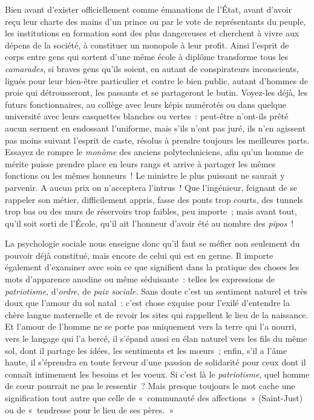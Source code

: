 \documentclass[french,twoside]{book} %
\begin{document}
Bien avant d’exister officiellement comme émanations de l’État, avant d’avoir reçu leur charte des mains d’un prince ou par le vote de représentants du peuple, les institutions en formation sont des plus dangereuses et cherchent à vivre aux dépens de la société, à constituer un monopole à leur profit. Ainsi l’esprit de corps entre gens qui sortent d’une même école à diplôme transforme tous les \emph{camarades}, si braves gens qu’ils soient, en autant de conspirateurs inconscients, ligués pour leur bien-être particulier et contre le bien public, autant d’hommes de proie qui détrousseront, les passants et se partageront le butin. Voyez-les déjà, les futurs  fonctionnaires, au collège avec leurs képis numérotés ou dans quelque université avec leurs casquettes blanches ou vertes : peut-être n’ont-ils prêté aucun serment en endossant l’uniforme, mais s’ils n’ont pas juré, ils n’en agissent pas moins suivant l’esprit de caste, résolus à prendre toujours les meilleures parts. Essayez de rompre le \emph{monôme} des anciens polytechniciens, afin qu’un homme de mérite puisse prendre place en leurs rangs et arrive à partager les mêmes fonctions ou les mêmes honneurs ! Le ministre le plus puissant ne saurait y parvenir. A aucun prix on n’acceptera l’intrus ! Que l’ingénieur, feignant de se rappeler son métier, difficilement appris, fasse des ponts trop courts, des tunnels trop bas ou des murs  de réservoirs trop faibles, peu importe ; mais avant tout, qu’il soit sorti de l’École, qu’il ait l’honneur d’avoir été au nombre des \emph{pipos} !\par
La psychologie sociale nous enseigne donc qu’il faut se méfier non seulement du pouvoir déjà constitué, mais encore de celui qui est en germe. Il importe également d’examiner avec soin ce que signifient dans la pratique des choses les mots d’apparence anodine ou même séduisante : telles les expressions de \emph{patriotisme}, d’\emph{ordre}, de \emph{paix sociale.} Sans doute c’est un sentiment naturel et très doux que l’amour du sol natal : c’est chose exquise pour l’exilé d’entendre la chère langue maternelle et de revoir les sites qui rappellent le lieu de la naissance. Et l’amour de  l’homme ne se porte pas uniquement vers la terre qui l’a nourri, vers le langage qui l’a bercé, il s’épand aussi en élan naturel vers les fils du même sol, dont il partage les idées, les sentiments et les mœurs ; enfin, s’il a l’âme haute, il s’éprendra en toute ferveur d’une passion de solidarité pour ceux dont il connaît intimement les besoins et les voeux. Si c’est là le \emph{patriotisme}, quel homme de cœur pourrait ne pas le ressentir ? Mais presque toujours le mot cache une signification tout autre que celle de « communauté des affections » (Saint-Just) ou de « tendresse pour le lieu de ses pères. »\par
\end{document}

